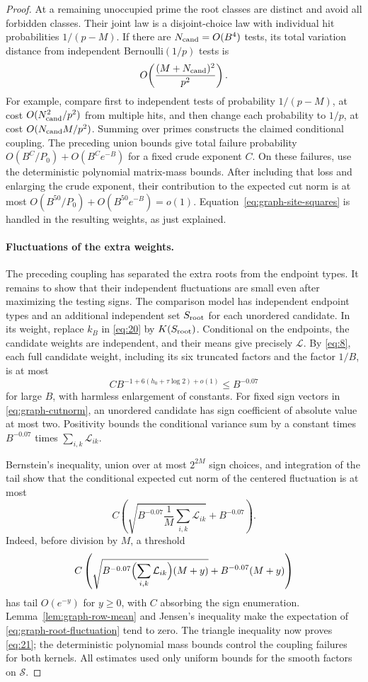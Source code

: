\begin{proof}
At a remaining unoccupied prime the root classes are
distinct and avoid all forbidden classes. Their joint law
is a disjoint-choice law with individual hit probabilities
$1/(p-M)$. If there are $N_{\rm cand}=O(B^4)$ tests, its
total variation distance from independent Bernoulli$(1/p)$
tests is
\[
 O\!\left(\frac{(M+N_{\rm cand})^2}{p^2}\right).
\]
For example, compare first to independent tests of probability
$1/(p-M)$, at cost $O(N_{\rm cand}^2/p^2)$ from multiple
hits, and then change each probability to $1/p$, at cost
$O(N_{\rm cand}M/p^2)$. Summing over primes constructs the
claimed conditional coupling. The preceding union bounds give total
failure probability $O(B^{C}/P_0)+O(B^{C}e^{-B})$ for a fixed crude
exponent $C$. On these failures, use the deterministic polynomial
matrix-mass bounds. After including that loss and enlarging the crude
exponent, their contribution to the expected cut norm is at most
$O(B^{50}/P_0)+O(B^{50}e^{-B})=o(1)$.
Equation~\eqref{eq:graph-site-squares}
is handled in the resulting weights, as just explained.

\paragraph{Fluctuations of the extra weights.}
The preceding coupling has separated the extra roots from the endpoint
types. It remains to show that their independent fluctuations are small
even after maximizing the testing signs.
The comparison model has independent endpoint types and
an additional independent set $S_{\rm root}$ for each
unordered candidate. In its weight, replace $k_B$ in
\eqref{eq:20} by $K(S_{\rm root})$. Conditional on the
endpoints, the candidate weights are independent, and
their means give precisely $\mathcal L$. By
\eqref{eq:8}, each full candidate weight, including its
six truncated factors and the factor $1/B$, is at most
\[
 C B^{-1+6(h_0+\tau\log2)+o(1)}\le B^{-0.07}
\]
for large $B$, with harmless enlargement of constants.
For fixed sign vectors in \eqref{eq:graph-cutnorm}, an
unordered candidate has sign coefficient of absolute
value at most two. Positivity bounds the conditional
variance sum by a constant times $B^{-0.07}$ times
$\sum_{i,k}\mathcal L_{ik}$.

Bernstein's inequality, union over at most $2^{2M}$
sign choices, and integration of the tail show that the
conditional expected cut norm of the centered fluctuation
is at most
\begin{equation}\label{eq:graph-root-fluctuation}
 C\left(
 \sqrt{B^{-0.07}\frac1M\sum_{i,k}\mathcal L_{ik}}
 +B^{-0.07}\right).
\end{equation}
Indeed, before division by $M$, a threshold
\[
 C\left(
 \sqrt{B^{-0.07}\Bigl(\sum_{i,k}\mathcal L_{ik}\Bigr)(M+y)}
 +B^{-0.07}(M+y)\right)
\]
has tail $O(e^{-y})$ for $y\ge0$, with $C$ absorbing
the sign enumeration. Lemma~\ref{lem:graph-row-mean}
and Jensen's inequality make the expectation of
\eqref{eq:graph-root-fluctuation} tend to zero.
The triangle inequality now proves \eqref{eq:21}; the
deterministic polynomial mass bounds control the coupling
failures for both kernels. All estimates used only uniform
bounds for the smooth factors on $\mathcal S$.
\end{proof}
